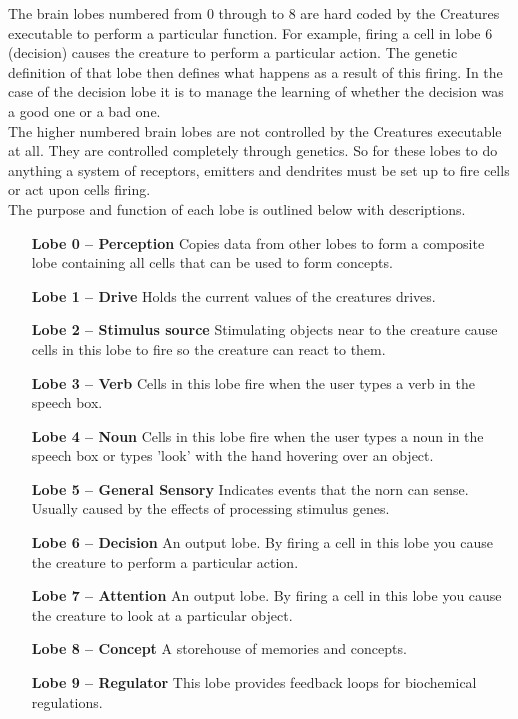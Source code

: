 \documentclass[11pt,twoside,a4paper]{article}
\begin{document}
The brain lobes numbered from 0 through to 8 are hard coded by the Creatures executable to perform a particular function. For example, firing a cell in lobe 6 (decision) causes the creature to perform a particular action. The genetic definition of that lobe then defines what happens as a result of this firing. In the case of the decision lobe it is to manage the learning of whether the decision was a good one or a bad one.~\\

The higher numbered brain lobes are not controlled by the Creatures executable at all. They are controlled completely through genetics. So for these lobes to do anything a system of receptors, emitters and dendrites must be set up to fire cells or act upon cells firing.~\\

The purpose and function of each lobe is outlined below with descriptions.
\begin{itemize}
\item[\textbf{Lobe 0 -- Perception}]
	Copies data from other lobes to form a composite lobe containing all cells that can be used to form concepts.
\item[\textbf{Lobe 1 -- Drive}]
	Holds the current values of the creatures drives.
\item[\textbf{Lobe 2 -- Stimulus source}]
	Stimulating objects near to the creature cause cells in this lobe to fire so the creature can react to them.
\item[\textbf{Lobe 3 -- Verb}]
	Cells in this lobe fire when the user types a verb in the speech box.
\item[\textbf{Lobe 4 -- Noun}]
	Cells in this lobe fire when the user types a noun in the speech box or types 'look' with the hand hovering over an object.
\item[\textbf{Lobe 5 -- General Sensory}]
	Indicates events that the norn can sense. Usually caused by the effects of processing stimulus genes.
\item[\textbf{Lobe 6 -- Decision}]
	An output lobe. By firing a cell in this lobe you cause the creature to perform a particular action.
\item[\textbf{Lobe 7 -- Attention}]
	An output lobe. By firing a cell in this lobe you cause the creature to look at a particular object.
\item[\textbf{Lobe 8 -- Concept}]
	A storehouse of memories and concepts.
\item[\textbf{Lobe 9 -- Regulator}]
	This lobe provides feedback loops for biochemical regulations. %
\end{itemize}~\\
\end{document}
